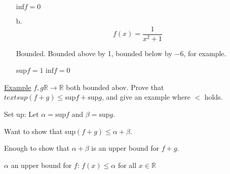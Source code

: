 \documentclass[12pt]{article}
\begin{document}
\begin{flushleft}
\begin{itemize}
$\text{inf}f = 0$

\item[b.] $$f(x) = \frac{1}{x^2 + 1}$$

Bounded. Bounded above by 1, bounded below by $-6$, for example.

$\text{sup}f = 1$
$\text{inf}f = 0$
\end{itemize}

\underline{Example} $f, g \mathbb{R} \rightarrow \mathbb{R}$ both bounded abov. Prove that $text{sup}(f + g) \leq \text{sup}f + \text{sup} g$, and give an example where $<$ holds.

Set up: Let $\alpha = \text{sup}f$ and $\beta = \text{sup}g$.

Want to show that $\text{sup}(f + g) \leq \alpha + \beta$.

Enough to show that $\alpha + \beta$ is an upper bound for $f + g$.

$\alpha$ an upper bound for $f$: $f(x) \leq \alpha$ for all $x \in \mathbb{R}$

\end{flushleft}
\end{document}
